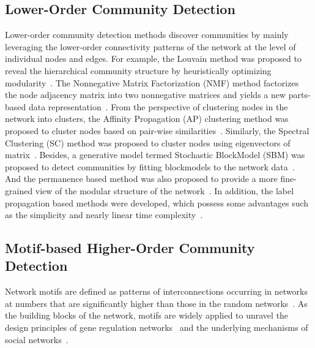 \documentclass[sigconf]{acmart}
\begin{document}
\subsection{Lower-Order Community Detection}
\label{sec:lowerorderCD}
Lower-order community detection methods discover communities by mainly leveraging the lower-order connectivity patterns of the network at the level of individual nodes and edges. For example, the Louvain method was proposed to reveal the hierarchical community structure by heuristically optimizing modularity~\cite{Vincent2008Fast}. The Nonnegative Matrix Factorization (NMF) method factorizes the node adjacency matrix into two nonnegative matrices and yields a new parts-based data representation~\cite{cai2008non,cai2011graph}. From the perspective of clustering nodes in the network into clusters, the Affinity Propagation (AP) clustering method was proposed to cluster nodes based on pair-wise similarities~\cite{frey2007clustering}. Similarly, the Spectral Clustering (SC) method was proposed to cluster nodes using eigenvectors of matrix~\cite{ng2002spectral}.
Besides, a generative model termed Stochastic BlockModel (SBM) was proposed to detect communities by fitting blockmodels to the network data~\cite{karrer2011stochastic,peixoto2014efficient}. And the permanence based method was also proposed to provide a more fine-grained view of the modular structure of the network~\cite{chakraborty2014permanence}. In addition, the label propagation based methods were developed, which possess some advantages such as the simplicity and nearly linear time complexity~\cite{raghavan2007near}.




\subsection{Motif-based Higher-Order Community Detection}
\label{sec:higherorderCD}

Network motifs are defined as patterns of interconnections occurring in networks at numbers that are significantly higher than those in the random networks~\cite{milo2002network,benson2016higher}. As the building blocks of the network, motifs are widely applied to unravel the design principles of gene regulation networks~\cite{shen2002network} and the underlying mechanisms of social networks~\cite{holland1977dynamic,wasserman1994social}.
\end{document}
